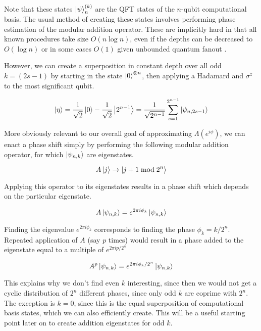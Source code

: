 Note that these states $\left\vert{\psi}\right\rangle^{(k)}_n$ are the
QFT states of the $n$-qubit computational basis. The usual method of
creating these states involves performing phase estimation of the
modular addition operator. These are implicitly hard in that
all known procedures take size $O(n\log n)$, even if the depths
can be decreased to $O(\log n)$ \cite{Jones2012} or in some cases $O(1)$
given unbounded quantum fanout
\cite{Browne2009}.

However, we can create a superposition in constant depth
over all odd $k=(2s-1)$
by starting in the state $\left\vert{0}\right\rangle^{\otimes n}$,
then applying a Hadamard and $\sigma^z$ to the most significant qubit.

\begin{equation}
\left\vert{\eta}\right\rangle = \frac{1}{\sqrt{2}} \left\vert{0}\right\rangle - \frac{1}{\sqrt{2}} \left\vert{2^{n-1}}\right\rangle =
\frac{1}{\sqrt{2^{n-1}}} \sum_{s=1}^{2^{n-1}} \left\vert{\psi_{n,2s-1}}\right\rangle
\end{equation}

More obviously relevant to our overall goal of approximating
$\Lambda(e^{i\phi})$, we can enact a phase
shift simply by performing the following modular addition operator, for
which $\left\vert{\psi_{n,k}}\right\rangle$ are eigenstates.

\begin{equation}
A\left\vert{j}\right\rangle \rightarrow \left\vert{j+1 \bmod 2^n}\right\rangle
\end{equation}

Applying this operator to its eigenstates results in a phase shift which
depends on the particular eigenstate.
 
\begin{equation}
A\left\vert{\psi_{n,k}}\right\rangle = e^{2\pi i \phi_k} \left\vert{\psi_{n,k}}\right\rangle
\end{equation}

Finding the eigenvalue $e^{2\pi i \phi_k}$ corresponds to finding
the phase $\phi_k = k / 2^n$.
Repeated application of $A$ (say $p$ times) would result in a phase
added to the eigenstate equal to a multiple of $e^{2\pi i p / 2^n}$

\begin{equation}
A^p\left\vert{\psi_{n,k}}\right\rangle = e^{2\pi i \phi_k / 2^n} \left\vert{\psi_{n,k}}\right\rangle
\end{equation}

This explains why we don't find even $k$ interesting,
since then we would not get a
cyclic distribution of $2^n$ different phases,
since only odd $k$
are coprime with $2^n$. The exception is $k=0$, since this is the
equal superposition of computational basis states, which we can also
efficiently create. This will be a useful starting point later on to
create addition eigenstates
for odd $k$.

